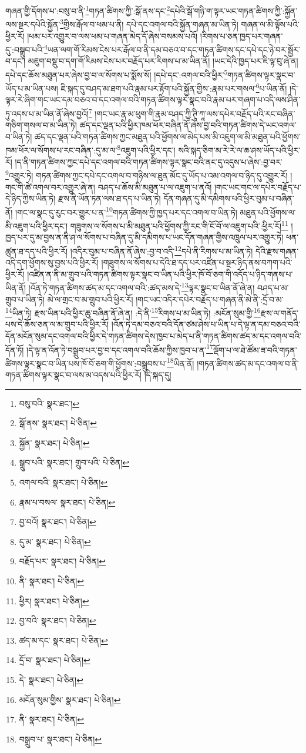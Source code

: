 གཞན་གྱི་དོགས་པ་:བསུ་བ་ནི་\footnote{བསུ་བའི་  སྣར་ཐང་། }གཏན་ཚིགས་ཀྱི་:སྒོ་ནས་དང་\footnote{སྒོ་ནས་  སྣར་ཐང་།  པེ་ཅིན། }དཔེའི་སྒོ་གཉི་ག་ལྟར་ཡང་གཏན་ཚིགས་ཀྱི་:སྐྱོན་ལས་སྔར་དཔེའི་སྐྱོན་\footnote{སྐྱོན་  སྣར་ཐང་།  པེ་ཅིན། }གྱིས་རྒོལ་བ་ཕམ་པ་ནི། དཔེ་དང་འགལ་བའི་སྐྱོན་གཞན་མ་ཡིན་ཏེ། གཞན་ལ་མི་ལྟོས་པའི་ཕྱིར་རོ། །ཕམ་པར་འགྱུར་བ་ལས་ཕམ་པ་གཞན་མེད་དོ་ཞེས་བསམས་པའོ། །རིགས་པ་ཅན་ཁྱད་པར་གཞན་དུ་:བསྒྲུབ་པའི་\footnote{སྒྲུབ་པའི་  སྣར་ཐང་། གྲུབ་པའི་  པེ་ཅིན། }ཡན་ལག་གོ་རིམས་ངེས་པར་རྒོལ་བ་ནི་དམ་བཅའ་བ་དང་གཏན་ཚིགས་དང་དཔེ་དང་ཉེ་བར་སྦྱོར་བ་དང་། མཇུག་བསྡུ་བ་དག་གོ་རིམས་ངེས་པར་བརྗོད་པར་རིགས་པ་མ་ཡིན་ནོ། །ཡང་དེའི་ཁྱད་པར་ཇི་ལྟ་བུ་ཞེ་ན། དཔེ་དང་ཆོས་མཐུན་པར་ཞེས་བྱ་བ་ལ་སོགས་པ་སྨོས་སོ། །དཔེ་དང་:འགལ་བའི་ཕྱིར་\footnote{འགལ་བའི་  སྣར་ཐང་།  པེ་ཅིན། }གཏན་ཚིགས་ལྟར་སྣང་བ་ཡོད་པ་མ་ཡིན་པས། ཇི་སྐད་དུ་བཤད་མ་ཐག་པའི་རྣམ་པར་རྟོག་པའི་སྐྱོན་གྱིས་:རྣམ་པར་གསལ་\footnote{རྣམ་པ་བསལ་  སྣར་ཐང་།  པེ་ཅིན། }པ་ཡིན་ནོ། །དེ་ལྟར་རེ་ཞིག་གང་ཡང་དམ་བཅའ་བ་དང་འགལ་བའི་གཏན་ཚིགས་ལྟར་སྣང་བའི་རྣམ་པར་གཞག་པ་འདི་ལས་ཤིན་ཏུ་འདས་པ་མ་ཡིན་ནོ་ཞེས་བྱའོ།\footnote{བྱ་བའོ།  སྣར་ཐང་།  པེ་ཅིན། } །གང་ཡང་རྣ་མ་ཕུག་གི་རྣམ་བཤད་ཀྱི་ཊཱི་ཀཱ་ལས་དཔེར་བརྗོད་པའི་རང་བཞིན་གཅིག་གསལ་བ་མ་ཡིན་ཏེ། ཚད་དང་ལྡན་པའི་ཕྱིར་ཁམ་ཕོར་བཞིན་ནོ་ཞེས་བྱ་བའི་གཏན་ཚིགས་དེ་ཡང་འགལ་བ་ཡིན་ཏེ། ཚད་དང་ལྡན་པའི་གཏན་ཚིགས་ཀྱང་མཐུན་པའི་ཕྱོགས་ལ་མེད་པས་མི་འཇུག་ལ་མི་མཐུན་པའི་ཕྱོགས་ཁམ་ཕོར་ལ་སོགས་པ་རང་བཞིན་:དུ་མ་ལ་\footnote{དུ་མ་  སྣར་ཐང་།  པེ་ཅིན། }འཇུག་པའི་ཕྱིར་དང་། སའི་སྐད་ཅིག་མ་རེ་རེ་ལ་ཆ་ཤས་ཡོད་པའི་ཕྱིར་རོ། །ད་ནི་གཏན་ཚིགས་ཀྱང་དཔེ་དང་འགལ་བའི་གཏན་ཚིགས་ལྟར་སྣང་བའི་ནང་དུ་འདུས་པ་ཞེས་:བྱ་བར་\footnote{བརྗོད་པར་  སྣར་ཐང་།  པེ་ཅིན། }འགྱུར་ཏེ། གཏན་ཚིགས་ཀྱང་དཔེ་དང་འགལ་བ་གཉིས་ལ་ཐུན་མོང་དུ་ཡོད་པ་འམ་འགལ་བ་ཉིད་དུ་འགྱུར་རོ། །གང་གི་ཚེ་འགལ་བར་འགྱུར་ཞེ་ན། བཤད་པ་ཆོས་མི་མཐུན་པ་ལ་འཇུག་པ་ནའོ། །གང་ཡང་གང་ལ་དཔེར་བརྗོད་པ་དེ་ཉིད་ཀྱིས་ཡིན་ཏེ། རྫས་ནི་ཡོན་ཏན་ལས་ཐ་དད་པ་ཡིན་ཏེ། དོན་གཞན་དུ་མི་དམིགས་པའི་ཕྱིར་བུམ་པ་བཞིན་ནོ། །གང་ལ་སྣང་དུ་རུང་བར་གྱུར་པ་ན་\footnote{ནི་  སྣར་ཐང་།  པེ་ཅིན། }གཏན་ཚིགས་ཀྱི་ཁྱད་པར་དང་འགལ་བ་ཡིན་ཏེ། མཐུན་པའི་ཕྱོགས་ལ་མི་འཇུག་པའི་ཕྱིར་དང་། གཟུགས་ལ་སོགས་པ་མི་མཐུན་པའི་ཕྱོགས་ཀྱི་རང་གི་ངོ་བོ་ལ་འཇུག་པའི་:ཕྱིར་རོ།\footnote{ཕྱིར།  སྣར་ཐང་།  པེ་ཅིན། } །ཁྱད་པར་དུ་མ་བྱས་ན་ནི་ཤ་ལ་སོགས་པ་བཞིན་དུ་མི་དམིགས་པ་ཡང་དོན་གཞན་གྱིས་འཁྲུལ་པར་འགྱུར་ཏེ། ཕན་ཚུན་ཐ་དད་པའི་ཕྱིར་རོ། །འདིར་བུམ་པ་བཞིན་ནོ་ཞེས་:བྱ་བ་འདི་\footnote{བྱ་བའི་  སྣར་ཐང་།  པེ་ཅིན། }དཔེ་ནི་རིགས་པ་མ་ཡིན་ཏེ། དེའི་རྫས་གཞན་འདི་དག་ཕྱོགས་སུ་བྱས་པའི་ཕྱིར་རོ། །གཟུགས་ལ་སོགས་པ་དེའི་ཐ་དད་པར་འཛིན་པ་སྔར་ཉིད་ནས་བཀག་པའི་ཕྱིར་རོ། །འཛིན་ན་ནི་མ་གྲུབ་པའི་གཏན་ཚིགས་ལྟར་སྣང་བ་ཡིན་པའི་ཕྱིར་ཁོ་བོ་ཅག་གི་འདོད་པ་ཉིད་གནས་པ་ཡིན་ནོ། །འོན་ཏེ་གཏན་ཚིགས་ཚད་མ་དང་འགལ་བའི་:ཚད་མས་དེ་\footnote{ཚད་མ་དང་  སྣར་ཐང་།  པེ་ཅིན། }ལྟར་སྣང་བ་ཡིན་ནོ་ཞེ་ན། བཤད་པ་མ་གྲུབ་པ་ཡིན་ཏེ། མེ་ལ་གྲང་བ་མ་གྲུབ་པའི་ཕྱིར་རོ། །གང་ཡང་འདིར་དཔེར་བརྗོད་པ་གཞན་ནི་མེ་ནི་:དྲོ་བ་མ་\footnote{དྲོ་བ་  སྣར་ཐང་།  པེ་ཅིན། }ཡིན་ཏེ། རྫས་ཡིན་པའི་ཕྱིར་ཆུ་བཞིན་ནོ་ཞེ་ན། :དེ་ནི་\footnote{དེ་  སྣར་ཐང་།  པེ་ཅིན། }རིགས་པ་མ་ཡིན་ཏེ། :མངོན་སུམ་གྱི་\footnote{མངོན་སུམ་གྱིས་  སྣར་ཐང་།  པེ་ཅིན། }རྫས་ལ་གནོད་པས་དེ་ཆོས་ཅན་ལ་མ་གྲུབ་པའི་ཕྱིར་རོ། །འོན་ཏེ་དམ་བཅའ་བའི་དོན་ཙམ་ཤེས་པ་ཡིན་པ་དེ་ལྟ་ན་དམ་བཅའ་བའི་དོན་མངོན་སུམ་དང་འགལ་བའི་ཕྱིར་དེ་གཏན་ཚིགས་དེས་ཁྱབ་པ་མེད་པ་ནི་གཏན་ཚིགས་ཚད་མ་དང་འགལ་བའི་དོན་ཏོ། །དེ་ལྟ་ན་འོན་ཏེ་བསྒྲུབ་པར་བྱ་བ་དང་འགལ་བའི་ཆོས་ཀྱིས་ཁྱབ་པ་ན་\footnote{ནི་  སྣར་ཐང་།  པེ་ཅིན། }ལྡོག་པ་ལ་ཐེ་ཚོམ་ཟ་བའི་གཏན་ཚིགས་ལྟར་སྣང་བ་ཡིན་པས་ཁོ་བོ་ཅག་གི་ཕྱོགས་:བསྒྲུབས་པ་\footnote{བསྒྲུབ་པ་  སྣར་ཐང་།  པེ་ཅིན། }ཡིན་ནོ། །གཏན་ཚིགས་ཚད་མ་དང་འགལ་བ་ནི་གཏན་ཚིགས་ལྟར་སྣང་བ་ལས་མ་འདས་པའི་ཕྱིར་རོ། །དེ་སྐད་དུ། 